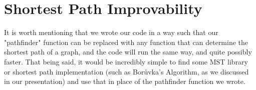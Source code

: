 \documentclass[12pt,letterpaper]{article}
\begin{document}
\section*{Shortest Path Improvability}

It is worth mentioning that we wrote our code in a way such that our "pathfinder" function can be replaced with any function that can determine the shortest path of a graph, and the code will run the same way, and quite possibly faster. That being said, it would be incredibly simple to find some MST library or shortest path implementation (such as Bor\r{u}vka's Algorithm, as we discussed in our presentation) and use that in place of the pathfinder function we wrote.

\newpage
\end{document}
